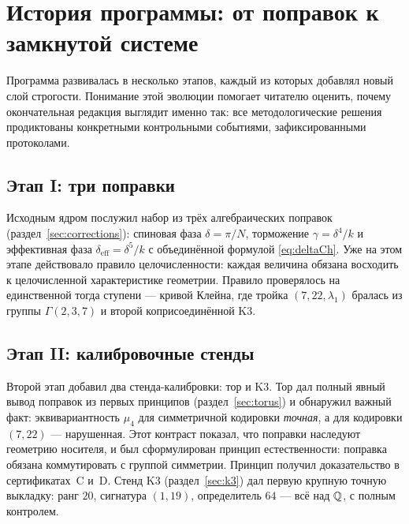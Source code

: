 
\section{История программы: от поправок к замкнутой системе}\label{sec:history}

Программа развивалась в несколько этапов, каждый из которых добавлял
новый слой строгости. Понимание этой эволюции помогает читателю
оценить, почему окончательная редакция выглядит именно так: все
методологические решения продиктованы конкретными контрольными
событиями, зафиксированными протоколами.

\subsection{Этап I: три поправки}

Исходным ядром послужил набор из трёх алгебраических поправок
(раздел~\ref{sec:corrections}): спиновая фаза $\delta=\pi/N$,
торможение $\gamma=\delta^4/k$ и эффективная фаза
$\delta_{\mathrm{eff}}=\delta^5/k$ с объединённой формулой
\eqref{eq:deltaCh}. Уже на этом этапе действовало правило
целочисленности: каждая величина обязана восходить к целочисленной
характеристике геометрии. Правило проверялось на единственной тогда
ступени --- кривой Клейна, где тройка $(7,22,\lambda_1)$ бралась из
группы $\Gamma(2,3,7)$ и второй коприсоединённой K3.

\subsection{Этап II: калибровочные стенды}

Второй этап добавил два стенда-калибровки: тор и K3. Тор дал полный
явный вывод поправок из первых принципов (раздел~\ref{sec:torus}) и
обнаружил важный факт: эквивариантность $\mu_4$ для симметричной
кодировки \emph{точная}, а для кодировки $(7,22)$ --- нарушенная.
Этот контраст показал, что поправки наследуют геометрию носителя,
и был сформулирован принцип естественности: поправка обязана
коммутировать с группой симметрии. Принцип получил доказательство в
сертификатах~C и~D. Стенд K3 (раздел~\ref{sec:k3}) дал первую
крупную точную выкладку: ранг $20$, сигнатура $(1,19)$, определитель
$64$ --- всё над $\mathbb{Q}$, с полным контролем.

